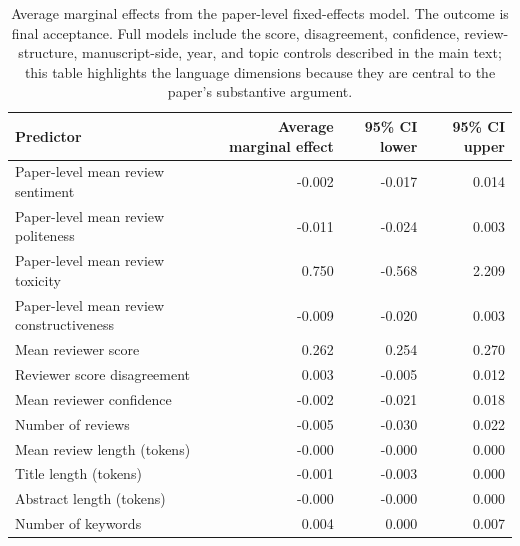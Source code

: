 \begin{table}[!htbp]
\centering
\begingroup
\normalsize
\renewcommand{\arraystretch}{1.20}
\setlength{\tabcolsep}{6pt}
\caption{Average marginal effects from the paper-level fixed-effects model. The outcome is final acceptance. Full models include the score, disagreement, confidence, review-structure, manuscript-side, year, and topic controls described in the main text; this table highlights the language dimensions because they are central to the paper's substantive argument.}
\label{tab:app:paperame}
\begin{tabular}{lrrr}
\toprule
Predictor & Average marginal effect & 95\% CI lower & 95\% CI upper \\
\midrule
Paper-level mean review sentiment & -0.002 & -0.017 & 0.014 \\
Paper-level mean review politeness & -0.011 & -0.024 & 0.003 \\
Paper-level mean review toxicity & 0.750 & -0.568 & 2.209 \\
Paper-level mean review constructiveness & -0.009 & -0.020 & 0.003 \\
Mean reviewer score & 0.262 & 0.254 & 0.270 \\
Reviewer score disagreement & 0.003 & -0.005 & 0.012 \\
Mean reviewer confidence & -0.002 & -0.021 & 0.018 \\
Number of reviews & -0.005 & -0.030 & 0.022 \\
Mean review length (tokens) & -0.000 & -0.000 & 0.000 \\
Title length (tokens) & -0.001 & -0.003 & 0.000 \\
Abstract length (tokens) & -0.000 & -0.000 & 0.000 \\
Number of keywords & 0.004 & 0.000 & 0.007 \\
\bottomrule
\end{tabular}
\endgroup
\end{table}

